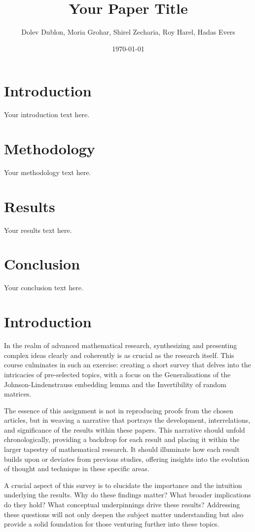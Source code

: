 \documentclass{article}
\title{Your Paper Title}
\author{Dolev Dublon, Moria Grohar, Shirel Zecharia, Roy Harel, Hadas Evers}
\date{\today}
\begin{document}
\maketitle

\section{Introduction}
Your introduction text here.

\section{Methodology}
Your methodology text here.

\section{Results}
Your results text here.

\section{Conclusion}
Your conclusion text here.



\section{Introduction}

In the realm of advanced mathematical research, synthesizing and presenting complex ideas clearly and coherently is as crucial as the research itself. This course culminates in such an exercise: creating a short survey that delves into the intricacies of pre-selected topics, with a focus on the Generalisations of the Johnson-Lindenstrauss embedding lemma and the Invertibility of random matrices.

The essence of this assignment is not in reproducing proofs from the chosen articles, but in weaving a narrative that portrays the development, interrelations, and significance of the results within these papers. This narrative should unfold chronologically, providing a backdrop for each result and placing it within the larger tapestry of mathematical research. It should illuminate how each result builds upon or deviates from previous studies, offering insights into the evolution of thought and technique in these specific areas.

A crucial aspect of this survey is to elucidate the importance and the intuition underlying the results. Why do these findings matter? What broader implications do they hold? What conceptual underpinnings drive these results? Addressing these questions will not only deepen the subject matter understanding but also provide a solid foundation for those venturing further into these topics.
\end{document}
